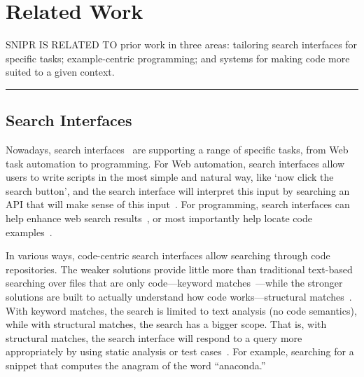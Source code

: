 \chapter{Related Work}{}
\label{sec:related}

\lettrine[lraise=0.1, nindent=0em, slope=-.5em]{S} {NIPR IS RELATED TO} prior work in three areas: tailoring search interfaces for specific tasks; example-centric programming; and systems for making code more suited to a given context.

\fancybreak{\pfbreakdisplay}

\section{Search Interfaces}
\label{sec:searchengines}

Nowadays, search interfaces~\cite{Hearst:2009wu, Morville:2010up} are supporting a range of specific tasks, from Web task automation to programming. For Web automation, search interfaces allow users to write scripts in the most simple and natural way, like `now click the search button', and the search interface will interpret this input by searching an API that will make sense of this input~\cite{Little:2007dh, Miller:2008ge, Cypher:2010ub}. For programming, search interfaces can help enhance web search results~\cite{Hoffmann:2007wo}, or most importantly help locate code examples~\cite{Bajracharya:2006vn, Brandt:2009jb}.

In various ways, code-centric search interfaces allow searching through code repositories. The weaker solutions provide little more than traditional text-based searching over files that are only code---keyword matches~\cite{Brandt:2010tp}---while the stronger solutions are built to actually understand how code works---structural matches~\cite{Bajracharya:2006vn, Sahavechaphan:2006tc, Bajracharya:2010um}. With keyword matches, the search is limited to text analysis (no code semantics), while with structural matches, the search has a bigger scope. That is, with structural matches, the search interface will respond to a query more appropriately by using   static analysis or test cases~\cite{Hummel:eq, LazzariniLemos:2007jh, Reiss:2009fu}. For example, searching for a snippet that computes the anagram of the word ``anaconda.''   

